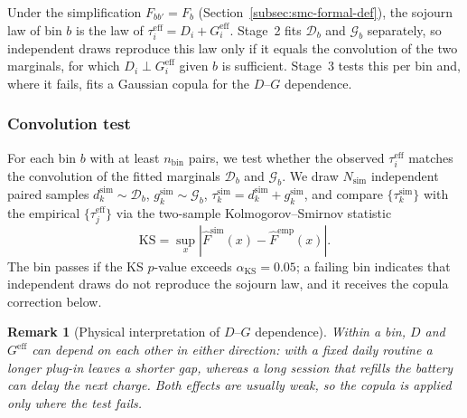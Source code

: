 \documentclass[journal]{IEEEtran}
\newtheorem{remark}{Remark}
\begin{document}
Under the simplification $F_{bb'} = F_b$ (Section~\ref{subsec:smc-formal-def}), the sojourn law of bin $b$ is the law of $\tau_i^{\mathrm{eff}} = D_i + G_i^{\mathrm{eff}}$. Stage~2 fits $\mathcal{D}_b$ and $\mathcal{G}_b$ separately, so independent draws reproduce this law only if it equals the convolution of the two marginals, for which $D_i \perp G_i^{\mathrm{eff}}$ given $b$ is sufficient. Stage~3 tests this per bin and, where it fails, fits a Gaussian copula for the $D$--$G$ dependence.






\subsubsection{Convolution test}

For each bin $b$ with at least $n_{\mathrm{bin}}$ pairs, we test whether the observed $\tau_i^{\mathrm{eff}}$ matches the convolution of the fitted marginals $\mathcal{D}_b$ and $\mathcal{G}_b$. We draw $N_{\mathrm{sim}}$ independent paired samples $d_k^{\mathrm{sim}} \sim \mathcal{D}_b$, $g_k^{\mathrm{sim}} \sim \mathcal{G}_b$, $\tau_k^{\mathrm{sim}} = d_k^{\mathrm{sim}} + g_k^{\mathrm{sim}}$, and compare $\{\tau_k^{\mathrm{sim}}\}$ with the empirical $\{\tau_j^{\mathrm{eff}}\}$ via the two-sample Kolmogorov--Smirnov statistic
\begin{equation}
    \mathrm{KS} = \sup_x \left| \hat{F}^{\mathrm{sim}}(x) - \hat{F}^{\mathrm{emp}}(x) \right|.
    \label{eq:ks-statistic}
\end{equation}
The bin passes if the KS $p$-value exceeds $\alpha_{\mathrm{KS}} = 0.05$; a failing bin indicates that independent draws do not reproduce the sojourn law, and it receives the copula correction below.

\begin{remark}[Physical interpretation of $D$--$G$ dependence]
\label{rem:dg-correlation}
Within a bin, $D$ and $G^{\mathrm{eff}}$ can depend on each other in either direction: with a fixed daily routine a longer plug-in leaves a shorter gap, whereas a long session that refills the battery can delay the next charge. Both effects are usually weak, so the copula is applied only where the test fails.
\end{remark}
\end{document}
